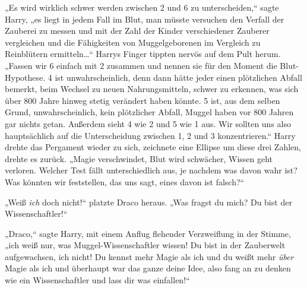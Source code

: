 „Es wird wirklich schwer werden zwischen 2 und 6 zu unterscheiden,“ sagte Harry, „es liegt in jedem Fall im Blut, man müsste versuchen den Verfall der Zauberei zu messen und mit der Zahl der Kinder verschiedener Zauberer vergleichen und die Fähigkeiten von Muggelgeborenen im Vergleich zu Reinblütern ermitteln…“ Harrys Finger tippten nervös auf dem Pult herum. „Fassen wir 6 einfach mit 2 zusammen und nennen sie für den Moment die Blut-Hypothese. 4 ist unwahrscheinlich, denn dann hätte jeder einen plötzlichen Abfall bemerkt, beim Wechsel zu neuen Nahrungsmitteln, schwer zu erkennen, was sich über 800 Jahre hinweg stetig verändert haben könnte. 5 ist, aus dem selben Grund, unwahrscheinlich, kein plötzlicher Abfall, Muggel haben vor 800 Jahren gar nichts getan. Außerdem sieht 4 wie 2 und 5 wie 1 aus. Wir sollten uns also hauptsächlich auf die Unterscheidung zwischen 1, 2 und 3 konzentrieren.“ Harry drehte das Pergament wieder zu sich, zeichnete eine Ellipse um diese drei Zahlen, drehte es zurück. „Magie verschwindet, Blut wird schwächer, Wissen geht verloren. Welcher Test fällt unterschiedlich aus, je nachdem was davon wahr ist? Was könnten wir feststellen, das uns sagt, eines davon ist falsch?“

„Weiß \emph{ich} doch nicht!“ platzte Draco heraus. „Was fragst du mich? Du bist der Wissenschaftler!“

„Draco,“ sagte Harry, mit einem Anflug flehender Verzweiflung in der Stimme, „ich weiß nur, was Muggel-Wissenschaftler wissen! Du bist in der Zauberwelt aufgewachsen, ich nicht! Du kennst mehr Magie als ich und du weißt mehr \emph{über} Magie als ich und überhaupt war das ganze deine Idee, also fang an zu denken wie ein Wissenschaftler und lass dir was einfallen!“

